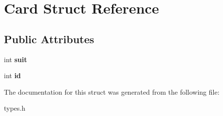 \hypertarget{struct_card}{\section{Card Struct Reference}
\label{struct_card}
}
\subsection*{Public Attributes}
\begin{DoxyCompactItemize}
\item 
\hypertarget{struct_card_a68d1b935f3e4830af01fb9dba6c8220a}{int {\bfseries suit}}\label{struct_card_a68d1b935f3e4830af01fb9dba6c8220a}

\item 
\hypertarget{struct_card_ae6fb6f495bba4d639696f934b495c15f}{int {\bfseries id}}\label{struct_card_ae6fb6f495bba4d639696f934b495c15f}

\end{DoxyCompactItemize}


The documentation for this struct was generated from the following file\-:\begin{DoxyCompactItemize}
\item 
types.\-h\end{DoxyCompactItemize}
